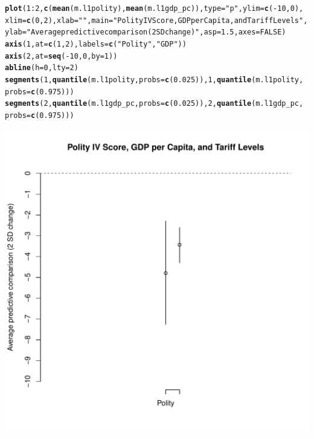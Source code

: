 \documentclass[12pt]{article}\usepackage[]{graphicx}\usepackage[]{color}
\makeatletter
\def\maxwidth{ %
  \ifdim\Gin@nat@width>\linewidth
    \linewidth
  \else
    \Gin@nat@width
  \fi
}
\newcommand{\hlnum}[1]{\textcolor[rgb]{0.686,0.059,0.569}{#1}}%
\newcommand{\hlstr}[1]{\textcolor[rgb]{0.192,0.494,0.8}{#1}}%
\newcommand{\hlopt}[1]{\textcolor[rgb]{0,0,0}{#1}}%
\newcommand{\hlstd}[1]{\textcolor[rgb]{0.345,0.345,0.345}{#1}}%
\newcommand{\hlkwc}[1]{\textcolor[rgb]{0.333,0.667,0.333}{#1}}%
\newcommand{\hlkwd}[1]{\textcolor[rgb]{0.737,0.353,0.396}{\textbf{#1}}}%
\newenvironment{kframe}{%
 \def\at@end@of@kframe{}%
 \ifinner\ifhmode%
  \def\at@end@of@kframe{\end{minipage}}%
  \begin{minipage}{\columnwidth}%
 \fi\fi%
 \def\FrameCommand##1{\hskip\@totalleftmargin \hskip-\fboxsep
 \colorbox{shadecolor}{##1}\hskip-\fboxsep
     \hskip-\linewidth \hskip-\@totalleftmargin \hskip\columnwidth}%
 \MakeFramed {\advance\hsize-\width
   \@totalleftmargin\z@ \linewidth\hsize
   \@setminipage}}%
 {\par\unskip\endMakeFramed%
 \at@end@of@kframe}
\newenvironment{knitrout}{}{} %
\makeatother
\begin{document}
\begin{knitrout}
\begin{kframe}
\begin{alltt}
\hlkwd{plot}\hlstd{(}\hlnum{1}\hlopt{:}\hlnum{2}\hlstd{,} \hlkwd{c}\hlstd{(}\hlkwd{mean}\hlstd{(m.l1polity),} \hlkwd{mean}\hlstd{(m.l1gdp_pc)),} \hlkwc{type} \hlstd{=} \hlstr{"p"}\hlstd{,} \hlkwc{ylim} \hlstd{=} \hlkwd{c}\hlstd{(}\hlopt{-}\hlnum{10}\hlstd{,} \hlnum{0}\hlstd{),}
    \hlkwc{xlim} \hlstd{=} \hlkwd{c}\hlstd{(}\hlnum{0}\hlstd{,} \hlnum{2}\hlstd{),} \hlkwc{xlab} \hlstd{=} \hlstr{""}\hlstd{,} \hlkwc{main} \hlstd{=} \hlstr{"Polity IV Score, GDP per Capita, and Tariff Levels"}\hlstd{,}
    \hlkwc{ylab} \hlstd{=} \hlstr{"Average predictive comparison (2 SD change)"}\hlstd{,} \hlkwc{asp} \hlstd{=} \hlnum{1.5}\hlstd{,} \hlkwc{axes} \hlstd{=} \hlnum{FALSE}\hlstd{)}
\hlkwd{axis}\hlstd{(}\hlnum{1}\hlstd{,} \hlkwc{at} \hlstd{=} \hlkwd{c}\hlstd{(}\hlnum{1}\hlstd{,} \hlnum{2}\hlstd{),} \hlkwc{labels} \hlstd{=} \hlkwd{c}\hlstd{(}\hlstr{"Polity"}\hlstd{,} \hlstr{"GDP"}\hlstd{))}
\hlkwd{axis}\hlstd{(}\hlnum{2}\hlstd{,} \hlkwc{at} \hlstd{=} \hlkwd{seq}\hlstd{(}\hlopt{-}\hlnum{10}\hlstd{,} \hlnum{0}\hlstd{,} \hlkwc{by} \hlstd{=} \hlnum{1}\hlstd{))}
\hlkwd{abline}\hlstd{(}\hlkwc{h} \hlstd{=} \hlnum{0}\hlstd{,} \hlkwc{lty} \hlstd{=} \hlnum{2}\hlstd{)}
\hlkwd{segments}\hlstd{(}\hlnum{1}\hlstd{,} \hlkwd{quantile}\hlstd{(m.l1polity,} \hlkwc{probs} \hlstd{=} \hlkwd{c}\hlstd{(}\hlnum{0.025}\hlstd{)),} \hlnum{1}\hlstd{,} \hlkwd{quantile}\hlstd{(m.l1polity,}
    \hlkwc{probs} \hlstd{=} \hlkwd{c}\hlstd{(}\hlnum{0.975}\hlstd{)))}
\hlkwd{segments}\hlstd{(}\hlnum{2}\hlstd{,} \hlkwd{quantile}\hlstd{(m.l1gdp_pc,} \hlkwc{probs} \hlstd{=} \hlkwd{c}\hlstd{(}\hlnum{0.025}\hlstd{)),} \hlnum{2}\hlstd{,} \hlkwd{quantile}\hlstd{(m.l1gdp_pc,}
    \hlkwc{probs} \hlstd{=} \hlkwd{c}\hlstd{(}\hlnum{0.975}\hlstd{)))}
\end{alltt}
\end{kframe}
\includegraphics[width=\maxwidth]{figure/unnamed-chunk-8-1} 

\end{knitrout}
\end{document}
